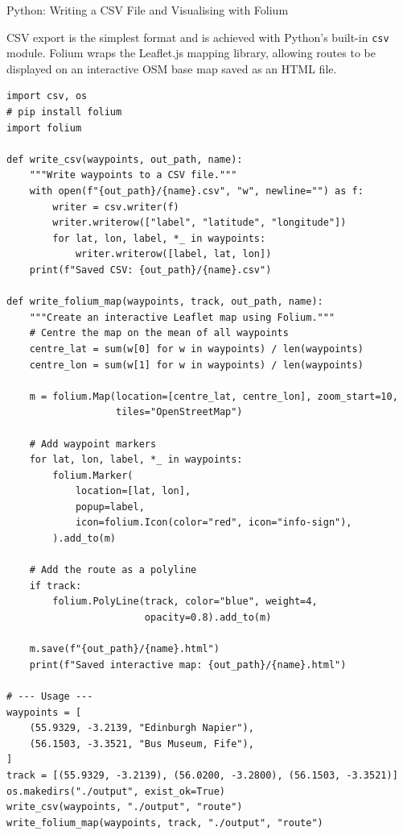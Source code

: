 \documentclass[aspectratio=169,10pt]{beamer}
\begin{document}
\begin{frame}[fragile]{Python: Writing a CSV File and Visualising with Folium}

  CSV export is the simplest format and is achieved with Python's built-in
  \texttt{csv} module.  Folium wraps the Leaflet.js mapping library,
  allowing routes to be displayed on an interactive OSM base map saved as
  an HTML file.

\begin{lstlisting}[style=pycode, caption={CSV export and interactive map with Folium}]
import csv, os
# pip install folium
import folium

def write_csv(waypoints, out_path, name):
    """Write waypoints to a CSV file."""
    with open(f"{out_path}/{name}.csv", "w", newline="") as f:
        writer = csv.writer(f)
        writer.writerow(["label", "latitude", "longitude"])
        for lat, lon, label, *_ in waypoints:
            writer.writerow([label, lat, lon])
    print(f"Saved CSV: {out_path}/{name}.csv")

def write_folium_map(waypoints, track, out_path, name):
    """Create an interactive Leaflet map using Folium."""
    # Centre the map on the mean of all waypoints
    centre_lat = sum(w[0] for w in waypoints) / len(waypoints)
    centre_lon = sum(w[1] for w in waypoints) / len(waypoints)

    m = folium.Map(location=[centre_lat, centre_lon], zoom_start=10,
                   tiles="OpenStreetMap")

    # Add waypoint markers
    for lat, lon, label, *_ in waypoints:
        folium.Marker(
            location=[lat, lon],
            popup=label,
            icon=folium.Icon(color="red", icon="info-sign"),
        ).add_to(m)

    # Add the route as a polyline
    if track:
        folium.PolyLine(track, color="blue", weight=4,
                        opacity=0.8).add_to(m)

    m.save(f"{out_path}/{name}.html")
    print(f"Saved interactive map: {out_path}/{name}.html")

# --- Usage ---
waypoints = [
    (55.9329, -3.2139, "Edinburgh Napier"),
    (56.1503, -3.3521, "Bus Museum, Fife"),
]
track = [(55.9329, -3.2139), (56.0200, -3.2800), (56.1503, -3.3521)]
os.makedirs("./output", exist_ok=True)
write_csv(waypoints, "./output", "route")
write_folium_map(waypoints, track, "./output", "route")
\end{lstlisting}

\end{frame}
\end{document}
